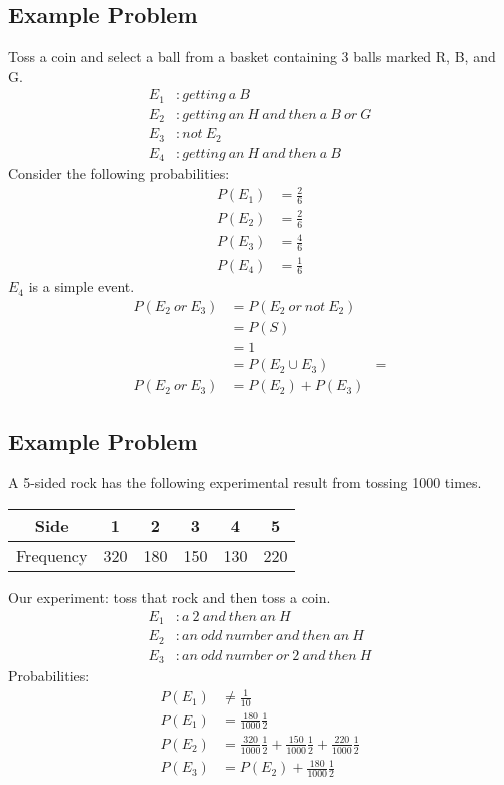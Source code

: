 \documentclass[letterpaper, 12pt]{math}
\begin{document}
\subsection*{Example Problem}
Toss a coin and select a ball from a basket containing 3 balls marked R, B, and
G.
\begin{align*}
  E_{1}&: getting\ a\ B \\
  E_{2}&: getting\ an\ H\ and\ then\ a\ B\ or\ G \\
  E_{3}&: not\ E_{2} \\
  E_{4}&: getting\ an\ H\ and\ then\ a\ B
\end{align*}
Consider the following probabilities:
\begin{align*}
  P(E_{1}) &= \frac{2}{6} \\
  P(E_{2}) &= \frac{2}{6} \\
  P(E_{3}) &= \frac{4}{6} \\
  P(E_{4}) &= \frac{1}{6}
\end{align*}
\( E_{4} \) is a simple event.
\begin{align*}
  P(E_{2}\ or\ E_{3}) &= P(E_{2}\ or\ not\ E_{2}) \\
  &= P(S) \\
  &= 1 \\
  &= P(E_{2} \cup E_{3}) &= \\
  P(E_{2}\ or\ E_{3}) &= P(E_{2}) + P(E_{3})
\end{align*}

\subsection*{Example Problem}
A 5-sided rock has the following experimental result from tossing 1000 times.
\begin{center}
  \begin{tabular}{|c|c|c|c|c|c|}
    \hline
    Side      & 1   & 2   & 3   & 4   & 5 \\
    \hline
    Frequency & 320 & 180 & 150 & 130 & 220 \\
    \hline
  \end{tabular}
\end{center}
Our experiment: toss that rock and then toss a coin.
\begin{align*}
  E_{1}&: a\ 2\ and\ then\ an\ H \\
  E_{2}&: an\ odd\ number\ and\ then\ an\ H \\
  E_{3}&: an\ odd\ number\ or\ 2\ and\ then\ H
\end{align*}
Probabilities:
\begin{align*}
  P(E_{1}) &\neq \frac{1}{10} \\
  P(E_{1}) &= \frac{180}{1000}\frac{1}{2} \\
  P(E_{2}) &= \frac{320}{1000}\frac{1}{2} + \frac{150}{1000}\frac{1}{2}+
    \frac{220}{1000}\frac{1}{2} \\
  P(E_{3}) &= P(E_{2}) + \frac{180}{1000}\frac{1}{2}
\end{align*}
\end{document}

